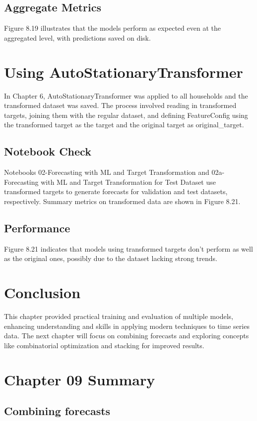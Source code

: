 \documentclass{article}
\begin{document}
\subsection{Aggregate Metrics}
Figure 8.19 illustrates that the models perform as expected even at the aggregated level, with predictions saved on disk.

\section{Using AutoStationaryTransformer}
In Chapter 6, AutoStationaryTransformer was applied to all households and the transformed dataset was saved. The process involved reading in transformed targets, joining them with the regular dataset, and defining FeatureConfig using the transformed target as the target and the original target as original_target.

\subsection{Notebook Check}
Notebooks 02-Forecasting with ML and Target Transformation and 02a-Forecasting with ML and Target Transformation for Test Dataset use transformed targets to generate forecasts for validation and test datasets, respectively. Summary metrics on transformed data are shown in Figure 8.21.

\subsection{Performance}
Figure 8.21 indicates that models using transformed targets don't perform as well as the original ones, possibly due to the dataset lacking strong trends.

\section{Conclusion}
This chapter provided practical training and evaluation of multiple models, enhancing understanding and skills in applying modern techniques to time series data. The next chapter will focus on combining forecasts and exploring concepts like combinatorial optimization and stacking for improved results.



\section{Chapter 09 Summary}
\subsection{Combining forecasts}
\end{document}
